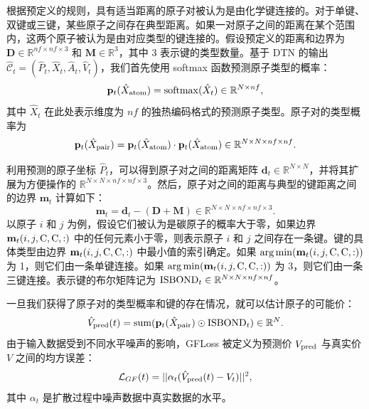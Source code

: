 根据预定义的规则，具有适当距离的原子对被认为是由化学键连接的。对于单键、双键或三键，某些原子之间存在典型距离。如果一对原子之间的距离在某个范围内，这两个原子被认为是由对应类型的键连接的。假设预定义的距离和边界为 $\mathbf{D} \in \mathbb{R}^{nf \times nf \times 3}$ 和 $\mathbf{M} \in \mathbb{R}^{3}$，其中 3 表示键的类型数量。基于 DTN 的输出 $\hat{\mathcal{C}}_t = (\hat{P}_t, \hat{X}_t, \hat{A}_t, \hat{V}_t)$，我们首先使用 softmax 函数预测原子类型的概率：
\begin{equation}
    {\mathbf{p}}_t(\hat{X}_{{\rm atom}}) = {\rm softmax}(\hat{X}_t) \in \mathbb{R}^{N \times nf},
\end{equation}
其中 $\hat{X}_t$ 在此处表示维度为 $nf$ 的独热编码格式的预测原子类型。原子对的类型概率为
\begin{equation}
    {\mathbf{p}}_t(\hat{X}_{{\rm pair}}) = {\mathbf{p}}_t(\hat{X}_{{\rm atom}}) \cdot {\mathbf{p}}_t(\hat{X}_{{\rm atom}}) \in \mathbb{R}^{N \times N \times nf \times nf}.
\end{equation}

利用预测的原子坐标 $\hat{P}_t$，可以得到原子对之间的距离矩阵 $\mathbf{d}_t \in \mathbb{R}^{N \times N}$，并将其扩展为方便操作的 $\mathbb{R}^{N \times N \times nf \times nf \times 3}$。然后，原子对之间的距离与典型的键距离之间的边界 $\mathbf{m}_t$ 计算如下：
\begin{equation}
    \mathbf{m}_t = \mathbf{d}_t - (\mathbf{D} + \mathbf{M}) \in \mathbb{R}^{N \times N \times nf \times nf \times 3}.
\end{equation}
以原子 $i$ 和 $j$ 为例，假设它们被认为是碳原子的概率大于零，如果边界 $\mathbf{m}_t(i,j,{\rm C},{\rm C},:)$ 中的任何元素小于零，则表示原子 $i$ 和 $j$ 之间存在一条键。键的具体类型由边界 $\mathbf{m}_t(i,j,{\rm C},{\rm C},:)$ 中最小值的索引确定。如果 $\arg\min (\mathbf{m}_t(i,j,{\rm C},{\rm C},:))$ 为 1，则它们由一条单键连接。如果 $\arg\min (\mathbf{m}_t(i,j,{\rm C},{\rm C},:))$ 为 3，则它们由一条三键连接。表示键的布尔矩阵记为 ${\rm ISBOND}_t \in \mathbb{R}^{N \times N \times nf \times nf}$。

一旦我们获得了原子对的类型概率和键的存在情况，就可以估计原子的可能价：
\begin{equation}
     \hat{V}_{{\rm pred}}(t) = {\rm sum}({\mathbf{p}}_t(\hat{X}_{{\rm pair}}) \odot {\rm ISBOND}_t) \in \mathbb{R}^{N}.
\end{equation}
由于输入数据受到不同水平噪声的影响，GFLoss 被定义为预测价 $V_{{\rm pred}}$ 与真实价 $V$ 之间的均方误差：
\begin{equation}
    \mathcal{L}_{GF}(t) = ||\alpha_t(\hat{V}_{{\rm pred}}(t) - V_t)||^2,
\end{equation}
其中 $\alpha_t$ 是扩散过程中噪声数据中真实数据的水平。

